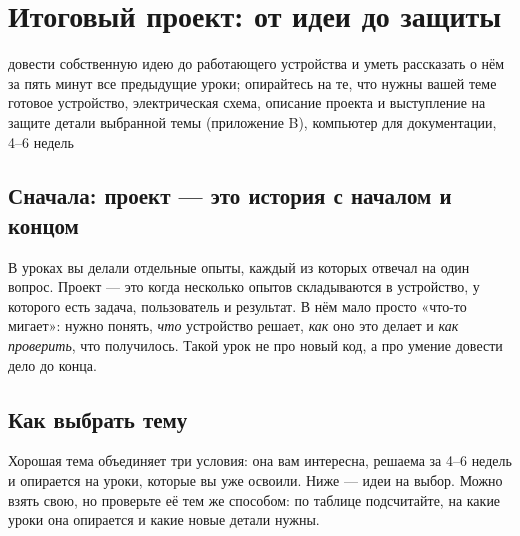 \section{Итоговый проект: от идеи до защиты}
\lessonintro
  {довести собственную идею до работающего устройства и уметь рассказать о нём за пять минут}
  {все предыдущие уроки; опирайтесь на те, что нужны вашей теме}
  {готовое устройство, электрическая схема, описание проекта и выступление на защите}
  {детали выбранной темы (приложение B), компьютер для документации, 4--6 недель}

\subsection{Сначала: проект --- это история с началом и концом}

В уроках вы делали отдельные опыты, каждый из которых отвечал на один вопрос. Проект --- это когда
несколько опытов складываются в устройство, у которого есть задача, пользователь и результат. В нём
мало просто «что-то мигает»: нужно понять, \emph{что} устройство решает, \emph{как} оно это делает и
\emph{как проверить}, что получилось. Такой урок не про новый код, а про умение довести дело до конца.

\subsection{Как выбрать тему}

Хорошая тема объединяет три условия: она вам интересна, решаема за 4--6 недель и опирается на уроки,
которые вы уже освоили. Ниже --- идеи на выбор. Можно взять свою, но проверьте её тем же способом: по
таблице подсчитайте, на какие уроки она опирается и какие новые детали нужны.

